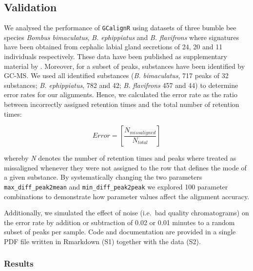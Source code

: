 \subsection{Validation}\label{validation}

We analysed the performance of \texttt{GCalignR} using datasets of three
bumble bee species \emph{Bombus bimaculatus}, \emph{B. ephippiatus} and
\emph{B. flavifrons} where signatures have been obtained from cephalic
labial gland secretions of 24, 20 and 11 individuals respectively. These
data have been published as supplementary material by
\citet{Dellicour.2013}. Moreover, for a subset of peaks, substances have
been identified by GC-MS. We used all identified substances (\emph{B.
bimaculatus}, 717 peaks of 32 substances; \emph{B. ephippiatus}, 782 and
42; \emph{B. flavifrons} 457 and 44) to determine error rates for our
alignments. Hence, we calculated the error rate as the ratio between
incorrectly assigned retention times and the total number of retention
times:

\begin{equation}
Error = \left[\frac{N_{missaligned}}{N_{total}}\right] 
\end{equation}

whereby \emph{N} denotes the number of retention times and peaks where
treated as missaligned whenever they were not assigned to the row that
defines the mode of a given substance. By systematically changing the
two parameters \texttt{max\_diff\_peak2mean} and
\texttt{min\_diff\_peak2peak} we explored 100 parameter combinations to
demonstrate how parameter values affect the alignment accuracy. \par
Additionally, we simulated the effect of noise (i.e.~bad quality
chromatograms) on the error rate by addition or subtraction of 0.02 or
0.01 minutes to a random subset of peaks per sample. Code and
documentation are provided in a single PDF file written in Rmarkdown
(S1) together with the data (S2).

\subsubsection{Results}\label{results}

